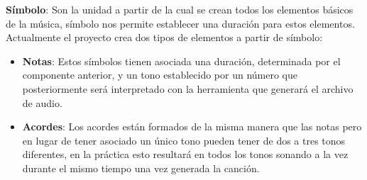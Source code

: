 \textbf{Símbolo}: Son la unidad a partir\color{blue} de la cual \color{black}se crean todos los elementos básicos de la música, símbolo nos permite establecer una duración para estos elementos. Actualmente el proyecto crea dos tipos de elementos a partir de símbolo:
\begin{itemize}
\item \textbf{Notas}: Estos símbolos tienen asociada una duración, determinada por el componente anterior, y un tono establecido por un número que posteriormente será interpretado con la herramienta que generará el archivo de audio.
\item \textbf{Acordes}: Los acordes están formados de la misma manera que las notas pero en lugar de tener asociado un único tono pueden tener de dos a tres tonos diferentes, en la práctica esto resultará en todos los tonos sonando a la vez durante el mismo tiempo una vez generada la canción.
\end{itemize}
 
